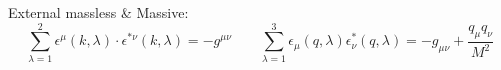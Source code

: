 External massless \& Massive:
\begin{equation*}
        \sum_{\lambda=1}^{2} \epsilon^{\mu}(k,\lambda) \cdot \epsilon^{*\nu}(k,\lambda) = -g^{\mu\nu}
        \qquad
        \sum_{\lambda=1}^{3} \epsilon_\mu(q,\lambda)\epsilon^*_\nu(q,\lambda)
        = -g_{\mu\nu} + \frac{q_\mu q_\nu}{M^2}
\end{equation*}

